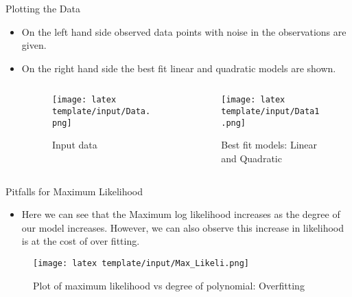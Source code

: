 \documentclass[t, aspectratio=169]{beamer}
\begin{document}
\begin{frame}{Plotting the Data}
 
\begin{itemize}
    \item On the left hand side observed data points with noise in the observations are given.
    \item On the right hand side the best fit linear and quadratic models are shown.

\end{itemize} 

 \begin{columns}[b]\


\begin{column}{0.5\textwidth}
\vspace{1.2cm}

 \begin{figure}

 \texttt{[image: latex template/input/Data.png]}
 \caption{Input data }
    \end{figure}
\end{column}

   \begin{column}{.5\textwidth}
     \begin{figure}
    \centering
        \texttt{[image: latex template/input/Data1.png]}
         \caption{Best fit models: Linear and Quadratic}
    \end{figure}
   \end{column}
 \end{columns}
 \end{frame}
 


\begin{frame}{Pitfalls for Maximum Likelihood}
 
\begin{itemize}
    \item Here we can see that the Maximum log likelihood increases as the degree of our model increases. However, we can also observe this increase in likelihood is at the cost of over fitting.
\end{itemize}
\vspace{1cm}
 \begin{figure}
 \texttt{[image: latex template/input/Max\_Likeli.png]}
 \caption{Plot of maximum likelihood vs degree of polynomial: Overfitting}
 
 \end{figure}
\end{frame}
\end{document}

